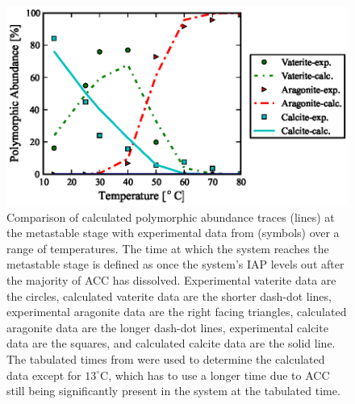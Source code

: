 \documentclass[preprint,3p,a4paper,times,12pt,authoryear]{elsarticle}
\begin{document}
\begin{figure}[!htb]
\begin{center}
\includegraphics{fig_9_PA_metastable}
\end{center}
\caption{ Comparison of calculated polymorphic abundance traces (lines) at the metastable stage with experimental data from \citep{Ogino1987} (symbols) over a range of temperatures.  The time at which the system reaches the metastable stage is defined as once the system's IAP levels out after the majority of ACC has dissolved.  Experimental vaterite data are the circles, calculated vaterite data are the shorter dash-dot lines, experimental aragonite data are the right facing triangles, calculated aragonite data are the longer dash-dot lines, experimental calcite data are the squares, and calculated calcite data are the solid line.  The tabulated times from \citep{Ogino1987} were used to determine the calculated data except for $13^\circ$C, which has to use a longer time due to ACC still being significantly present in the system at the tabulated time.}
\label{metastable}
\end{figure}
\end{document}
